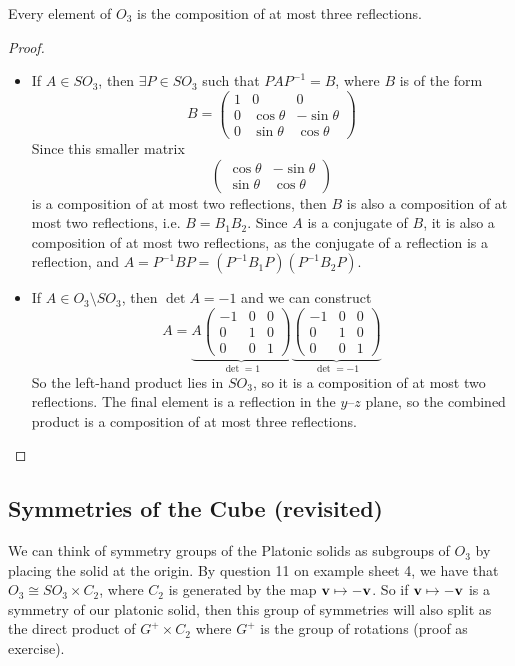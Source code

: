 \documentclass{article}
\begin{document}
\begin{corollary}
	Every element of $O_3$ is the composition of at most three reflections.
\end{corollary}
\begin{proof}
	\begin{itemize}
		\item If $A \in SO_3$, then $\exists P \in SO_3$ such that $PAP^{-1} = B$, where $B$ is of the form
		      \[ B = \begin{pmatrix}
				      1 & 0           & 0            \\
				      0 & \cos \theta & -\sin \theta \\
				      0 & \sin \theta & \cos \theta
			      \end{pmatrix} \]
		      Since this smaller matrix
		      \[ \begin{pmatrix}
				      \cos \theta & -\sin \theta \\
				      \sin \theta & \cos \theta
			      \end{pmatrix} \]
		      is a composition of at most two reflections, then $B$ is also a composition of at most two reflections, i.e. $B = B_1 B_2$. Since $A$ is a conjugate of $B$, it is also a composition of at most two reflections, as the conjugate of a reflection is a reflection, and $A = P^{-1}BP = (P^{-1}B_1P)(P^{-1}B_2P)$.
		\item If $A \in O_3 \setminus SO_3$, then $\det A = -1$ and we can construct
		      \[ A = \underbrace{A\begin{pmatrix}
					      -1 & 0 & 0 \\
					      0  & 1 & 0 \\
					      0  & 0 & 1
				      \end{pmatrix}}_{\det = 1}\underbrace{\begin{pmatrix}
					      -1 & 0 & 0 \\
					      0  & 1 & 0 \\
					      0  & 0 & 1
				      \end{pmatrix}}_{\det = -1} \]
		      So the left-hand product lies in $SO_3$, so it is a composition of at most two reflections. The final element is a reflection in the $y$--$z$ plane, so the combined product is a composition of at most three reflections.
	\end{itemize}
\end{proof}

\subsection{Symmetries of the Cube (revisited)}
We can think of symmetry groups of the Platonic solids as subgroups of $O_3$ by placing the solid at the origin. By question 11 on example sheet 4, we have that $O_3 \cong SO_3 \times C_2$, where $C_2$ is generated by the map $\vb v \mapsto -\vb v$. So if $\vb v\mapsto -\vb v$ is a symmetry of our platonic solid, then this group of symmetries will also split as the direct product of $G^+ \times C_2$ where $G^+$ is the group of rotations (proof as exercise).
\end{document}
